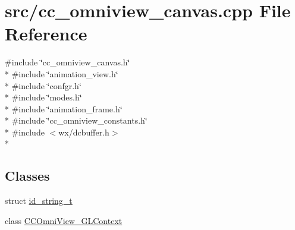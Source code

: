 \hypertarget{a00184}{\section{src/cc\-\_\-omniview\-\_\-canvas.cpp File Reference}
\label{a00184}
}
{\ttfamily \#include \char`\"{}cc\-\_\-omniview\-\_\-canvas.\-h\char`\"{}}\\*
{\ttfamily \#include \char`\"{}animation\-\_\-view.\-h\char`\"{}}\\*
{\ttfamily \#include \char`\"{}confgr.\-h\char`\"{}}\\*
{\ttfamily \#include \char`\"{}modes.\-h\char`\"{}}\\*
{\ttfamily \#include \char`\"{}animation\-\_\-frame.\-h\char`\"{}}\\*
{\ttfamily \#include \char`\"{}cc\-\_\-omniview\-\_\-constants.\-h\char`\"{}}\\*
{\ttfamily \#include $<$wx/dcbuffer.\-h$>$}\\*
\subsection*{Classes}
\begin{DoxyCompactItemize}
\item 
struct \hyperlink{a00109}{id\-\_\-string\-\_\-t}
\item 
class \hyperlink{a00050}{C\-C\-Omni\-View\-\_\-\-G\-L\-Context}
\end{DoxyCompactItemize}
